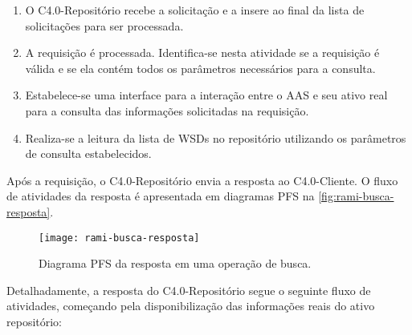 \begin{enumerate}
		\item O C4.0-Repositório recebe a solicitação e a insere ao final da lista de solicitações para ser processada.
		
		\item A requisição é processada. Identifica-se nesta atividade se a requisição é válida e se ela contém todos os parâmetros necessários para a consulta.
		
		\item Estabelece-se uma interface para a interação entre o AAS e seu ativo real para a consulta das informações solicitadas na requisição.
		
		\item Realiza-se a leitura da lista de WSDs no repositório utilizando os parâmetros de consulta estabelecidos.
		
	\end{enumerate}

	Após a requisição, o C4.0-Repositório envia a resposta ao C4.0-Cliente. O fluxo de atividades da resposta é apresentada em diagramas PFS na \autoref{fig:rami-busca-resposta}.

	\begin{figure}[htb]
		\centering
		\caption{Diagrama PFS da resposta em uma operação de busca.}
		\label{fig:rami-busca-resposta}
		\texttt{[image: rami-busca-resposta]}
	\end{figure}

	Detalhadamente, a resposta do C4.0-Repositório segue o seguinte fluxo de atividades, começando pela disponibilização das informações reais do ativo repositório:
	
